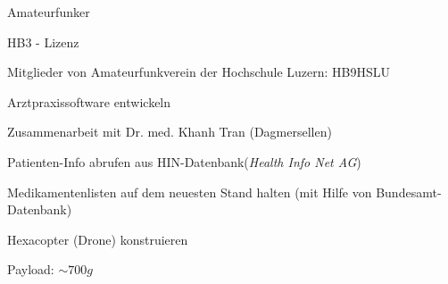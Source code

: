 

\begin{cventries}

	\cventry
	{} %
	{Amateurfunker} %
	{} %
	{} %
	{\vspace{-12pt}
		\begin{cvitems} %
			\item {HB3 - Lizenz}
			\item {Mitglieder von Amateurfunkverein der Hochschule Luzern: HB9HSLU}
		\end{cvitems}
	}
	
	\cventry
	{} %
	{Arztpraxissoftware entwickeln} %
	{} %
	{} %
	{\vspace{-12pt}
		\begin{cvitems} %
			\item {Zusammenarbeit mit Dr. med. Khanh Tran (Dagmersellen)}
			\item {Patienten-Info abrufen aus HIN-Datenbank(\textit{Health Info Net AG})}
			\item {Medikamentenlisten auf dem neuesten Stand halten (mit Hilfe von Bundesamt-Datenbank)}
		\end{cvitems}
	}
	
	
	\cventry
	{} %
	{Hexacopter (Drone) konstruieren} %
	{} %
	{} %
	{\vspace{-12pt}
		\begin{cvitems} %
			\item {Payload: $ \sim 700g$}
		\end{cvitems}
	}
	

\end{cventries}
